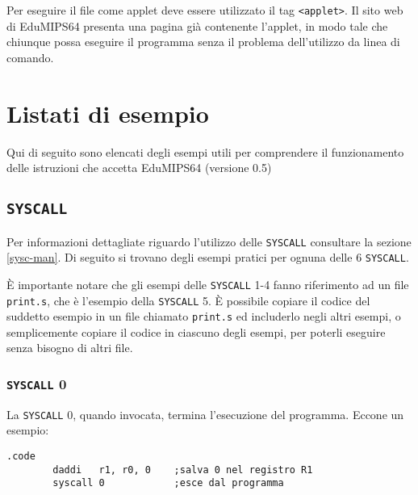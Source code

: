 \documentclass[12pt]{report}
\newcommand{\EM}{EduMIPS64}
\newcommand{\EV}{0.5}
\newcommand{\SC}{\texttt{SYSCALL}}
\begin{document}
Per eseguire il file come applet deve essere utilizzato il tag \texttt{<applet>}. Il sito web di \EM{}
presenta una pagina gi\`{a} contenente l'applet, in modo tale che chiunque possa eseguire il programma senza il problema dell'utilizzo da linea di comando.

\printindex

\chapter{Listati di esempio}
Qui di seguito sono elencati degli esempi utili per comprendere il funzionamento delle istruzioni che accetta \EM{} (versione \EV)

\section{\SC{}}
Per informazioni dettagliate riguardo l'utilizzo delle \SC{} consultare la
sezione \ref{sysc-man}. Di seguito si trovano degli esempi pratici per ognuna
delle 6 \SC{}.

\`E importante notare che gli esempi delle \SC{} 1-4 fanno riferimento ad un
file \texttt{print.s}, che \`e l'esempio della \SC{} 5. \`E possibile copiare il
codice del suddetto esempio in un file chiamato \texttt{print.s} ed includerlo
negli altri esempi, o semplicemente copiare il codice in ciascuno degli esempi,
per poterli eseguire senza bisogno di altri file.

\subsection{\SC{} 0}
La \SC{} 0, quando invocata, termina l'esecuzione del programma.
Eccone un esempio:
\begin{lstlisting}[caption={Esempio \SC{} 0}, label={code:syscall0}, style={mips}]
        .code
        daddi   r1, r0, 0    ;salva 0 nel registro R1
        syscall 0            ;esce dal programma
\end{lstlisting}
\end{document}
